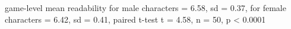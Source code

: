 game-level mean readability for male characters = 6.58, sd = 0.37, for female characters = 6.42, sd = 0.41, paired t-test t = 4.58, n = 50, p < 0.0001